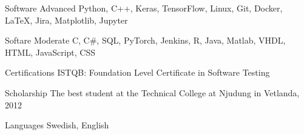 

\begin{cvskills}

  \cvskill
    {Software Advanced} %
    {Python, C++, Keras, TensorFlow, Linux, Git, Docker, LaTeX, Jira, Matplotlib, Jupyter} %

  \cvskill
    {Softare Moderate} %
    {C, C\#, SQL, PyTorch, Jenkins, R, Java, Matlab, VHDL, HTML, JavaScript, CSS} %

  \cvskill
  {Certifications} %
  {ISTQB: Foundation Level Certificate in Software Testing} %

  \cvskill
    {Scholarship} %
    {The best student at the Technical College at Njudung in Vetlanda, 2012} %

  \cvskill
    {Languages} %
    {Swedish, English} %

\end{cvskills}
